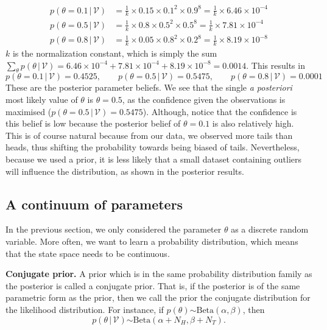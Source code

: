 \documentclass{article}
\newcommand{\giv}{\,|\,}
\begin{document}
\begin{align*}
    p(\theta = 0.1 \giv \mathcal{V}) &= \frac{1}{k} \times 0.15 \times 0.1^2 \times 0.9^8 = \frac{1}{k} \times 6.46 \times 10^{-4}\\
    p(\theta = 0.5 \giv \mathcal{V}) &= \frac{1}{k} \times 0.8 \times 0.5^2 \times 0.5^8 = \frac{1}{k} \times 7.81 \times 10^{-4}\\
    p(\theta = 0.8 \giv \mathcal{V}) &= \frac{1}{k} \times 0.05 \times 0.8^2 \times 0.2^8 = \frac{1}{k} \times 8.19 \times 10^{-8}
\end{align*}
\noindent $k$ is the normalization constant, which is simply the sum $\sum_\theta p(\theta \giv \mathcal{V}) =6.46 \times 10^{-4} + 7.81 \times 10^{-4} + 8.19 \times 10^{-8} = 0.0014$. This results in 
$$
    p(\theta = 0.1 \giv \mathcal{V}) = 0.4525, \qquad p(\theta = 0.5 \giv \mathcal{V}) = 0.5475, \qquad p(\theta = 0.8 \giv \mathcal{V}) = 0.0001
$$
\noindent These are the posterior parameter beliefs. We see that the single \textit{a posteriori} most likely value of $\theta$ is $\theta = 0.5$, as the confidence given the observations is maximised ($p(\theta = 0.5 \giv \mathcal{V}) = 0.5475$). Although, notice that the confidence is this belief is low because the posterior belief of $\theta = 0.1$ is also relatively high. This is of course natural because from our data, we observed more tails than heads, thus shifting the probability towards being biased of tails. Nevertheless, because we used a prior, it is less likely that a small dataset containing outliers will influence the distribution, as shown in the posterior results.   

\subsection{A continuum of parameters}
In the previous section, we only considered the parameter $\theta$ as a discrete random variable. More often, we want to learn a probability distribution, which means that the state space needs to be continuous. 
\\
\begin{theorem}
    \textbf{Conjugate prior.} A prior which is in the same probability distribution family as the posterior is called a conjugate prior. That is, if the posterior is of the same parametric form as the prior, then we call the prior the conjugate distribution for the likelihood distribution. For instance, if $p(\theta) \stackrel{}{\sim} \text{Beta}(\alpha, \beta)$, then
    $$
        p(\theta \giv \mathcal{V}) \stackrel{}{\sim} \text{Beta}(\alpha + N_H, \beta + N_T).
    $$
\end{theorem}
\end{document}

